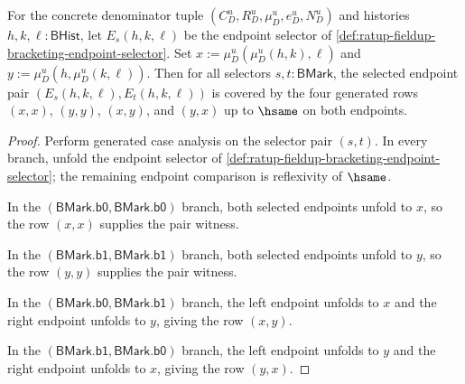 \begin{lemma}
\label{lem:ratup-fieldup-bracketing-selector-pair-cases}
For the concrete denominator tuple $(C_D^u,R_D^u,\mu_D^u,e_D^u,N_D^u)$ and
histories $h,k,\ell:\mathsf{BHist}$, let $E_s(h,k,\ell)$ be the endpoint
selector of \autoref{def:ratup-fieldup-bracketing-endpoint-selector}. Set
$x:=\mu_D^u(\mu_D^u(h,k),\ell)$ and
$y:=\mu_D^u(h,\mu_D^u(k,\ell))$. Then for all selectors
$s,t:\mathsf{BMark}$, the selected endpoint pair
$(E_s(h,k,\ell),E_t(h,k,\ell))$ is covered by the four generated rows
$(x,x)$, $(y,y)$, $(x,y)$, and $(y,x)$ up to $\hsame$ on both endpoints.
\end{lemma}
\begin{proof}
Perform generated case analysis on the selector pair $(s,t)$. In every branch,
unfold the endpoint selector of
\autoref{def:ratup-fieldup-bracketing-endpoint-selector}; the remaining endpoint
comparison is reflexivity of $\hsame$.

In the $(\mathsf{BMark.b0},\mathsf{BMark.b0})$ branch, both selected endpoints
unfold to $x$, so the row $(x,x)$ supplies the pair witness.

In the $(\mathsf{BMark.b1},\mathsf{BMark.b1})$ branch, both selected endpoints
unfold to $y$, so the row $(y,y)$ supplies the pair witness.

In the $(\mathsf{BMark.b0},\mathsf{BMark.b1})$ branch, the left endpoint
unfolds to $x$ and the right endpoint unfolds to $y$, giving the row $(x,y)$.

In the $(\mathsf{BMark.b1},\mathsf{BMark.b0})$ branch, the left endpoint
unfolds to $y$ and the right endpoint unfolds to $x$, giving the row $(y,x)$.
\end{proof}

